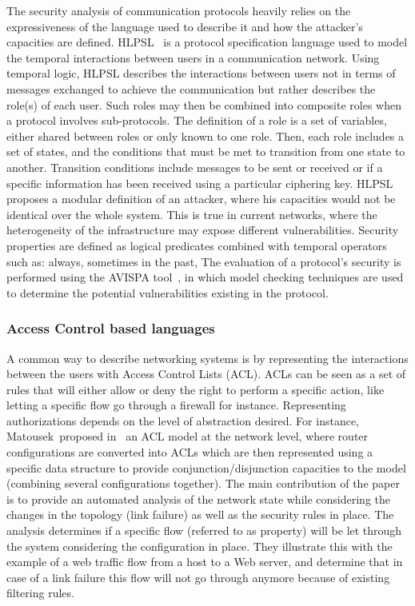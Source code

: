 The security analysis of communication protocols heavily relies on the expressiveness of the language used to describe it and how the attacker's capacities are defined. HLPSL~\cite{HLPSL-Chevalier2004} is a protocol specification language used to model the temporal interactions between users in a communication network. Using temporal logic, HLPSL describes the interactions between users not in terms of messages exchanged to achieve the communication but rather describes the role(s) of each user. Such roles may then be combined into composite roles when a protocol involves sub-protocols.
The definition of a role is a set of variables, either shared between roles or only known to one role.
Then, each role includes a set of states, and the conditions that must be met to transition from one state to another. Transition conditions include messages to be sent or received or if a specific information has been received using a particular ciphering key.
HLPSL proposes a modular definition of an attacker, where his capacities would not be identical over the whole system.
This is true in current networks, where the heterogeneity of the infrastructure may expose different vulnerabilities.
Security properties are defined as logical predicates combined with temporal operators such as: always, sometimes in the past, \etc
The evaluation of a protocol's security is performed using the AVISPA tool~\cite{avispa}, in which model checking techniques are used to determine the potential vulnerabilities existing in the protocol.

\subsubsection{Access Control based languages}
A common way to describe networking systems is by representing the interactions between the users with Access Control Lists (ACL).
ACLs can be seen as a set of rules that will either allow or deny the right to perform a specific action, like letting a specific flow go through a firewall for instance.
Representing authorizations depends on the level of abstraction desired.
For instance, Matousek~\etal proposed in~\cite{Matousek2008} an ACL model at the network level, where router configurations are converted into ACLs which are then represented using a specific data structure to provide conjunction/disjunction capacities to the model (\ie combining several configurations together).
The main contribution of the paper is to provide an automated analysis of the network state while considering the changes in the topology (\ie link failure) as well as the security rules in place.
The analysis determines if a specific flow (referred to as property) will be let through the system considering the configuration in place. They illustrate this with the example of a web traffic flow from a host to a Web server, and determine that in case of a link failure this flow will not go through anymore because of existing filtering rules.

